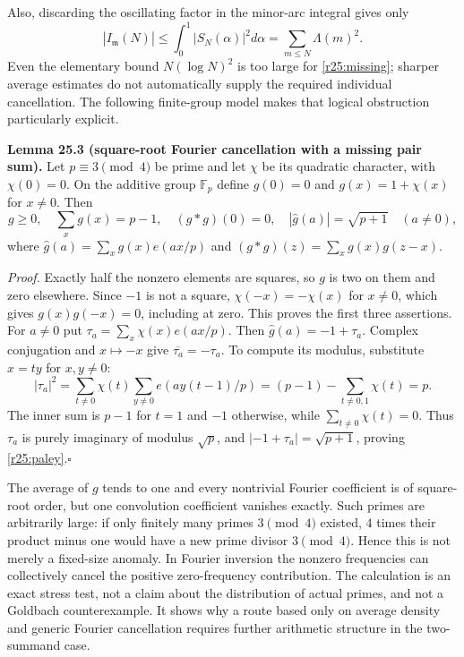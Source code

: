 \documentclass[11pt,a4paper]{article}
\newcommand{\F}{\mathbb{F}}
\numberwithin{equation}{section}
\begin{document}
Also, discarding the oscillating factor in the minor-arc integral gives
only
\[
 |I_{\mathfrak m}(N)|\le\int_0^1|S_N(\alpha)|^2d\alpha
                    =\sum_{m\le N}\Lambda(m)^2.
\]
Even the elementary bound $N(\log N)^2$ is too large for
\eqref{r25:missing}; sharper average estimates do not automatically
supply the required individual cancellation. The following finite-group
model makes that logical obstruction particularly explicit.

\textbf{Lemma 25.3 (square-root Fourier cancellation with a missing pair sum).}
Let $p\equiv3\pmod4$ be prime and let $\chi$ be its quadratic character,
with $\chi(0)=0$. On the additive group $\F_p$ define
$g(0)=0$ and $g(x)=1+\chi(x)$ for $x\ne0$. Then
\begin{equation}\label{r25:paley}
 g\ge0,\quad \sum_xg(x)=p-1,\quad (g*g)(0)=0,
 \quad |\widehat g(a)|=\sqrt{p+1}\quad(a\ne0),
\end{equation}
where $\widehat g(a)=\sum_xg(x)e(ax/p)$ and
$(g*g)(z)=\sum_xg(x)g(z-x)$.

\emph{Proof.} Exactly half the nonzero elements are squares, so $g$
is two on them and zero elsewhere. Since $-1$ is not a square,
$\chi(-x)=-\chi(x)$ for $x\ne0$, which gives $g(x)g(-x)=0$,
including at zero. This proves the first three assertions.
For $a\ne0$ put $\tau_a=\sum_x\chi(x)e(ax/p)$. Then
$\widehat g(a)=-1+\tau_a$. Complex conjugation and $x\mapsto-x$
give $\overline{\tau_a}=-\tau_a$. To compute its modulus, substitute
$x=ty$ for $x,y\ne0$:
\[
 |\tau_a|^2
 =\sum_{t\ne0}\chi(t)\sum_{y\ne0}e(ay(t-1)/p)
 =(p-1)-\sum_{t\ne0,1}\chi(t)=p.
\]
The inner sum is $p-1$ for $t=1$ and $-1$ otherwise, while
$\sum_{t\ne0}\chi(t)=0$. Thus $\tau_a$ is purely imaginary of
modulus $\sqrt p$, and $|-1+\tau_a|=\sqrt{p+1}$, proving
\eqref{r25:paley}.\hfill$\square$

The average of $g$ tends to one and every nontrivial Fourier coefficient
is of square-root order, but one convolution coefficient vanishes
exactly. Such primes are arbitrarily large: if only finitely many primes
$3\pmod4$ existed, $4$ times their product minus one would have a new
prime divisor $3\pmod4$. Hence this is not merely a fixed-size anomaly.
In Fourier inversion the nonzero frequencies can collectively cancel
the positive zero-frequency contribution. The calculation is an exact
stress test, not a claim about the distribution of actual primes, and
not a Goldbach counterexample. It shows why a route based only on
average density and generic Fourier cancellation requires further
arithmetic structure in the two-summand case.
\end{document}
